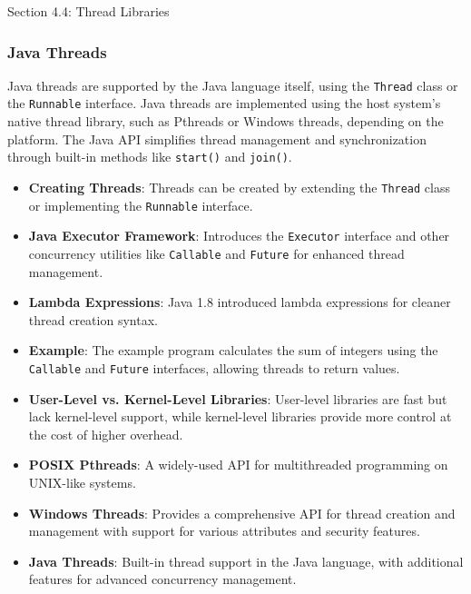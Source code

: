 \begin{notes}{Section 4.4: Thread Libraries}
\begin{highlight}
    \end{highlight}
    
    \subsubsection*{Java Threads}
    
    Java threads are supported by the Java language itself, using the \texttt{Thread} class or the \texttt{Runnable} interface. Java threads are implemented using the host system's native thread library, 
    such as Pthreads or Windows threads, depending on the platform. The Java API simplifies thread management and synchronization through built-in methods like \texttt{start()} and \texttt{join()}.
    
    \begin{highlight}
    
        \begin{itemize}
            \item \textbf{Creating Threads}: Threads can be created by extending the \texttt{Thread} class or implementing the \texttt{Runnable} interface.
            \item \textbf{Java Executor Framework}: Introduces the \texttt{Executor} interface and other concurrency utilities like \texttt{Callable} and \texttt{Future} for enhanced thread management.
            \item \textbf{Lambda Expressions}: Java 1.8 introduced lambda expressions for cleaner thread creation syntax.
            \item \textbf{Example}: The example program calculates the sum of integers using the \texttt{Callable} and \texttt{Future} interfaces, allowing threads to return values.
        \end{itemize}
    
    \end{highlight}
    
    \begin{highlight}
    
        \begin{itemize}
            \item \textbf{User-Level vs. Kernel-Level Libraries}: User-level libraries are fast but lack kernel-level support, while kernel-level libraries provide more control at the cost of higher overhead.
            \item \textbf{POSIX Pthreads}: A widely-used API for multithreaded programming on UNIX-like systems.
            \item \textbf{Windows Threads}: Provides a comprehensive API for thread creation and management with support for various attributes and security features.
            \item \textbf{Java Threads}: Built-in thread support in the Java language, with additional features for advanced concurrency management.
        \end{itemize}
    

\end{highlight}
\end{notes}
